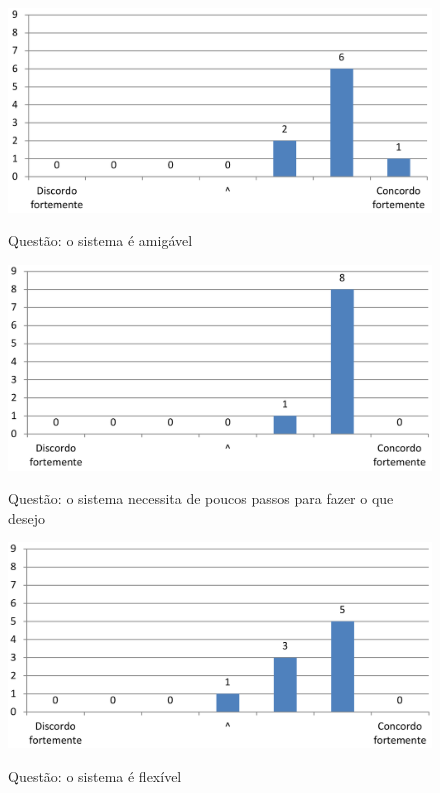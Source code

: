 \begin{figure}[h]
\centering
\caption{Questão: o sistema é amigável}
\includegraphics[width=1.0\textwidth]{use/fu_amigavel.pdf} 
\label{fig:fu_amigavel} 
\end{figure}


\begin{figure}[h]
\centering
\caption{Questão: o sistema necessita de poucos passos para fazer o que desejo}
\includegraphics[width=1.0\textwidth]{use/fu_poucos_passos.pdf} 
\label{fig:fu_poucos_passos} 
\end{figure}


\begin{figure}[h]
\centering
\caption{Questão: o sistema é flexível}
\includegraphics[width=1.0\textwidth]{use/fu_flexivel.pdf} 
\label{fig:fu_flexivel} 
\end{figure}


